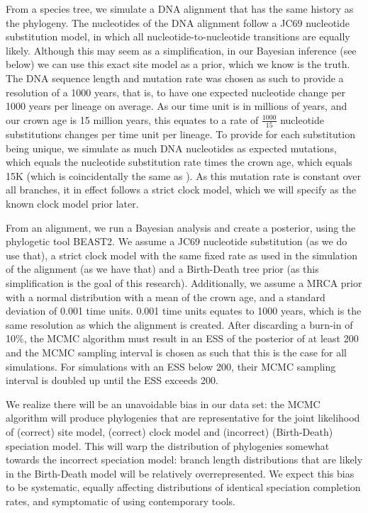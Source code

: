 \documentclass{article}
\begin{document}
From a species tree, we simulate a DNA alignment that has the same history
as the phylogeny. The nucleotides of the DNA alignment follow a JC69
nucleotide substitution model, in which all nucleotide-to-nucleotide transitions
are equally likely. Although this may seem as a simplification, in our Bayesian
inference (see below) we can use this exact site model as a prior, which we 
know is the truth.
The DNA sequence length and mutation rate was chosen as such to provide a
resolution of a 1000 years, that is, to have one expected nucleotide change 
per 1000 years per lineage on average. As our time unit is in 
millions of years, and our crown age is 15 million years,
this equates to a rate of $\frac{1000}{15}$ nucleotide substitutions 
changes per time unit per lineage. To provide for each substitution being unique,
we simulate as much DNA nucleotides as expected mutations, which equals the
nucleotide substitution rate times the crown age, which equals 15K (which is
coincidentally the same as \cite{moller2018}). As this
mutation rate is constant over all branches, it in effect follows a strict 
clock model, which we will specify as the known clock model prior later.

From an alignment, we run a Bayesian analysis and create a posterior, 
using the phylogetic tool BEAST2. We assume a
JC69 nucleotide substitution (as we do use that), a strict clock model with 
the same fixed rate as used in the simulation of the alignment (as
we have that) and a Birth-Death tree prior (as this simplification is the goal
of this research). Additionally, we assume a MRCA prior with a normal distribution
with a mean of the crown age, and a standard deviation of 0.001 time units. 0.001
time units equates to 1000 years, which is the same resolution as which the
alignment is created. After discarding a burn-in of 10\%, the MCMC algorithm must 
result in an ESS of the posterior of at least 200 and the MCMC sampling interval is 
chosen as such that this is the case for all simulations. For simulations
with an ESS below 200, their MCMC sampling interval is doubled up until
the ESS exceeds 200. 

We realize there will be an unavoidable bias in our data set: the MCMC
algorithm will produce phylogenies that are representative for the joint
likelihood of (correct) site model, (correct) clock model and 
(incorrect) (Birth-Death) speciation model. This will
warp the distribution of phylogenies somewhat towards the incorrect
speciation model: branch length distributions that are likely in the
Birth-Death model will be relatively overrepresented. We expect
this bias to be systematic, equally affecting distributions
of identical speciation completion rates, and symptomatic
of using contemporary tools.
\end{document}
